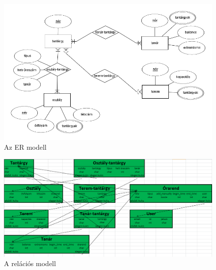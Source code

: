 \begin{figure}
	\includegraphics[width=\linewidth]{images/ermodell.png}
	\caption{Az ER modell}
\end{figure}

\begin{figure}
	\includegraphics[width=\linewidth]{images/relmodell.png}
	\caption{A relációs modell}
\end{figure}

